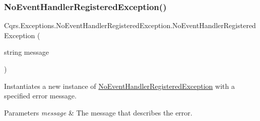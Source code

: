 \subsubsection{\texorpdfstring{No\+Event\+Handler\+Registered\+Exception()}{NoEventHandlerRegisteredException()}\hspace{0.1cm}{\footnotesize\ttfamily [2/2]}}
{\footnotesize\ttfamily Cqrs.\+Exceptions.\+No\+Event\+Handler\+Registered\+Exception.\+No\+Event\+Handler\+Registered\+Exception (\begin{DoxyParamCaption}\item[{string}]{message }\end{DoxyParamCaption})\hspace{0.3cm}{\ttfamily [protected]}}



Instantiates a new instance of \hyperlink{classCqrs_1_1Exceptions_1_1NoEventHandlerRegisteredException}{No\+Event\+Handler\+Registered\+Exception} with a specified error message. 


\begin{DoxyParams}{Parameters}
{\em message} & The message that describes the error.\\
\hline
\end{DoxyParams}
